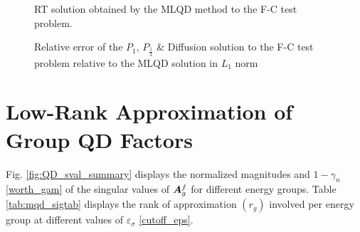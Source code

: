 	\begin{figure}[ht!]
		\centering
		\caption{\label{fig:ref_sols}
			RT solution obtained by the MLQD method to the F-C test problem.}
	\end{figure}

	\begin{figure}[ht!]
		\centering
		\caption{\label{fig:ref_errs_inf_roms}
			Relative error of the $P_1$, $P_{\frac{1}{3}}$ \& Diffusion solution to the F-C test problem relative to the MLQD solution in $L_1$ norm}
	\end{figure}

\section{Low-Rank Approximation of Group QD Factors} \label{sec:reduced_qdf}
	
	Fig. \ref{fig:QD_sval_summary} displays the normalized magnitudes and $1-\gamma_n$ \eqref{worth_gam} of the singular values of $\bm{A}^f_g$ for different energy groups. Table \ref{tab:mqd_sigtab} displays the rank of approximation $(r_g)$ involved per energy group at different values of  $\varepsilon_\sigma$ \eqref{cutoff_eps}.
	

